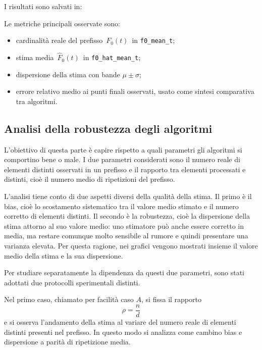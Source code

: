 I risultati sono salvati in:
\begin{center}
\small
{}
\end{center}

Le metriche principali osservate sono:
\begin{itemize}
    \item cardinalità reale del prefisso \(\,F_0(t)\,\) in
    \texttt{f0\_mean\_t};
    \item stima media \(\,\hat{F}_0(t)\,\) in \texttt{f0\_hat\_mean\_t};
    \item dispersione della stima con bande \(\mu \pm \sigma\);
    \item errore relativo medio ai punti finali osservati, usato come sintesi
    comparativa tra algoritmi.
\end{itemize}

\subsection{Analisi della robustezza degli algoritmi}
L'obiettivo di questa parte è capire rispetto a quali parametri gli algoritmi si
  comportino bene o male. I due parametri considerati sono il numero reale di
  elementi distinti osservati in un prefisso e il rapporto tra elementi processati
  e distinti, cioè il numero medio di ripetizioni del prefisso.

  L'analisi tiene conto di due aspetti diversi della qualità della stima. Il primo
  è il bias, cioè lo scostamento sistematico tra il valore medio stimato e il
  numero corretto di elementi distinti. Il secondo è la robustezza, cioè la
  dispersione della stima attorno al suo valore medio: uno stimatore può anche
  essere corretto in media, ma restare comunque molto sensibile al rumore e quindi
  presentare una varianza elevata. Per questa ragione, nei grafici vengono
  mostrati insieme il valore medio della stima e la sua dispersione.

  Per studiare separatamente la dipendenza da questi due parametri, sono stati
  adottati due protocolli sperimentali distinti.

  Nel primo caso, chiamato per facilit\`a caso $A$, si fissa il rapporto
  \[
  \rho=\frac{n}{d}
  \]
  e si osserva l'andamento della stima al variare del numero reale di elementi
  distinti presenti nel prefisso. In questo modo si analizza come cambino bias e
  dispersione a parità di ripetizione media.

